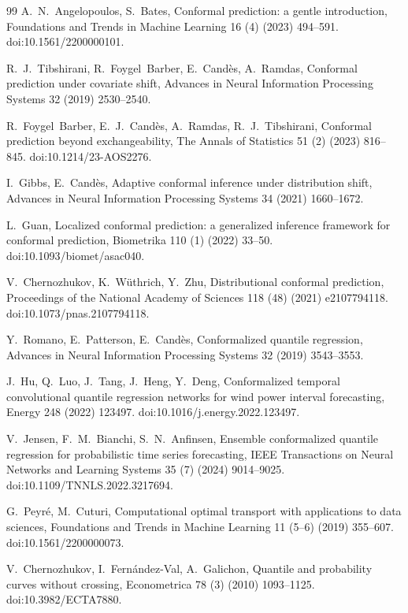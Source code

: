 \documentclass[preprint,3p,times]{elsarticle}
\begin{document}
\begin{thebibliography}{99}
A.~N.~Angelopoulos, S.~Bates,
Conformal prediction: a gentle introduction,
Foundations and Trends in Machine Learning 16 (4) (2023) 494--591.
doi:10.1561/2200000101.

R.~J.~Tibshirani, R.~Foygel~Barber, E.~Cand\`es, A.~Ramdas,
Conformal prediction under covariate shift,
Advances in Neural Information Processing Systems 32 (2019) 2530--2540.

R.~Foygel~Barber, E.~J.~Cand\`es, A.~Ramdas, R.~J.~Tibshirani,
Conformal prediction beyond exchangeability,
The Annals of Statistics 51 (2) (2023) 816--845.
doi:10.1214/23-AOS2276.

I.~Gibbs, E.~Cand\`es,
Adaptive conformal inference under distribution shift,
Advances in Neural Information Processing Systems 34 (2021) 1660--1672.

L.~Guan,
Localized conformal prediction: a generalized inference framework for conformal prediction,
Biometrika 110 (1) (2022) 33--50.
doi:10.1093/biomet/asac040.

V.~Chernozhukov, K.~W\"uthrich, Y.~Zhu,
Distributional conformal prediction,
Proceedings of the National Academy of Sciences 118 (48) (2021) e2107794118.
doi:10.1073/pnas.2107794118.

Y.~Romano, E.~Patterson, E.~Cand\`es,
Conformalized quantile regression,
Advances in Neural Information Processing Systems 32 (2019) 3543--3553.

J.~Hu, Q.~Luo, J.~Tang, J.~Heng, Y.~Deng,
Conformalized temporal convolutional quantile regression networks for wind power interval forecasting,
Energy 248 (2022) 123497.
doi:10.1016/j.energy.2022.123497.

V.~Jensen, F.~M.~Bianchi, S.~N.~Anfinsen,
Ensemble conformalized quantile regression for probabilistic time series forecasting,
IEEE Transactions on Neural Networks and Learning Systems 35 (7) (2024) 9014--9025.
doi:10.1109/TNNLS.2022.3217694.

G.~Peyr\'e, M.~Cuturi,
Computational optimal transport with applications to data sciences,
Foundations and Trends in Machine Learning 11 (5--6) (2019) 355--607.
doi:10.1561/2200000073.

V.~Chernozhukov, I.~Fern\'andez-Val, A.~Galichon,
Quantile and probability curves without crossing,
Econometrica 78 (3) (2010) 1093--1125.
doi:10.3982/ECTA7880.


\end{thebibliography}
\end{document}
